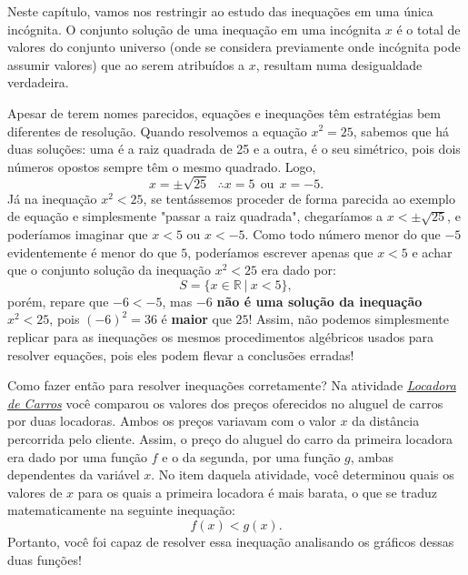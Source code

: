 Neste capítulo, vamos nos restringir ao estudo das inequações em uma única incógnita. O conjunto solução de uma inequação em uma incógnita $x$ é o total de valores do conjunto universo (onde se considera previamente onde incógnita pode assumir valores) que ao serem atribuídos a $x$, resultam numa desigualdade verdadeira.

Apesar de terem nomes parecidos, equações e inequações têm estratégias bem diferentes de resolução. Quando resolvemos a equação $x^2 = 25$, sabemos que há duas soluções: uma é a raiz quadrada de 25 e a outra, é o seu simétrico, pois dois números opostos sempre têm o mesmo quadrado. Logo,
$$
x = \pm \sqrt{25} \ \ \ \therefore x = 5 \ \ \mbox{ou} \ \ x = -5.
$$
Já na inequação $x^2 <25$, se tentássemos proceder de forma parecida ao exemplo de equação e simplesmente "passar a raiz quadrada", chegaríamos a $x < \pm \sqrt{25}$, e poderíamos imaginar que $x < 5$ ou $x < -5$. Como todo número menor do que $-5$ evidentemente é menor do que $5$, poderíamos escrever apenas que $x<5$ e achar que o conjunto solução da inequação $x^2 < 25$ era dado por:
$$
S = \{x \in \mathbb{R} \ | \ x <5\},
$$ 
porém, repare que $-6 < -5$, mas $-6$ \textbf{não é uma solução da inequação} $x^2 <25$, pois $(-6)^2 = 36$ é \textbf{maior} que $25$! Assim, não podemos simplesmente replicar para as inequações os mesmos procedimentos algébricos usados para resolver equações, pois eles podem flevar a conclusões erradas!



Como fazer então para resolver inequações corretamente? Na atividade \emph{\hyperref[locadora]{Locadora de Carros}} você comparou os valores dos preços oferecidos no aluguel de carros por duas locadoras. Ambos os preços variavam com o valor $x$ da distância percorrida pelo cliente. Assim, o preço do aluguel do carro da primeira locadora era dado por uma função $f$ e o da segunda, por uma função $g$, ambas dependentes da variável $x$. No item  daquela atividade, você determinou quais os valores de $x$ para os quais a primeira locadora é mais barata, o que se traduz matematicamente na seguinte inequação:
$$
f(x) < g(x).
$$
Portanto, você foi capaz de resolver essa inequação analisando os gráficos dessas duas funções! 

